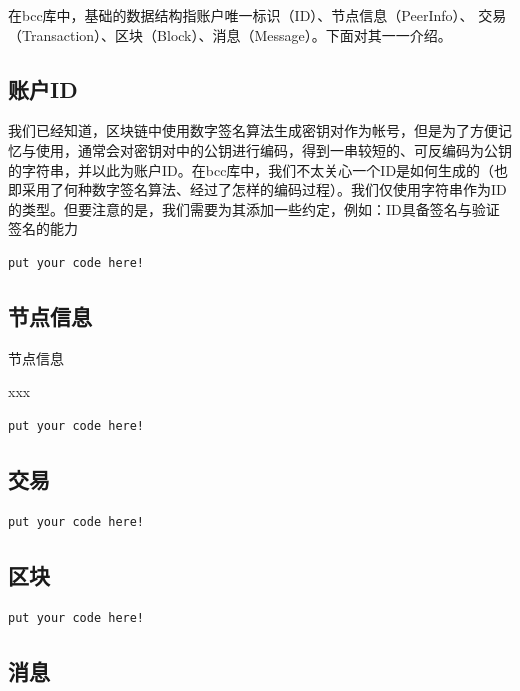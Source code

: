 在bcc库中，基础的数据结构指账户唯一标识（ID）、节点信息（PeerInfo）、 交易（Transaction）、区块（Block）、消息（Message）。下面对其一一介绍。

\subsection{账户ID}

我们已经知道，区块链中使用数字签名算法生成密钥对作为帐号，但是为了方便记忆与使用，通常会对密钥对中的公钥进行编码，得到一串较短的、可反编码为公钥的字符串，并以此为账户ID。在bcc库中，我们不太关心一个ID是如何生成的（也即采用了何种数字签名算法、经过了怎样的编码过程）。我们仅使用字符串作为ID的类型。但要注意的是，我们需要为其添加一些约定，例如：ID具备签名与验证签名的能力

\begin{lstlisting}[float,style=Go,caption=xxx]
	put your code here!
\end{lstlisting}	

\subsection{节点信息}

节点信息


xxx

\begin{lstlisting}[float,style=Go,caption=xxx]
	put your code here!
\end{lstlisting}

\subsection{交易}

\begin{lstlisting}[float,style=Go,caption=xxx]
	put your code here!
\end{lstlisting}

\subsection{区块}

\begin{lstlisting}[float,style=Go,caption=xxx]
	put your code here!
\end{lstlisting}

\subsection{消息}

